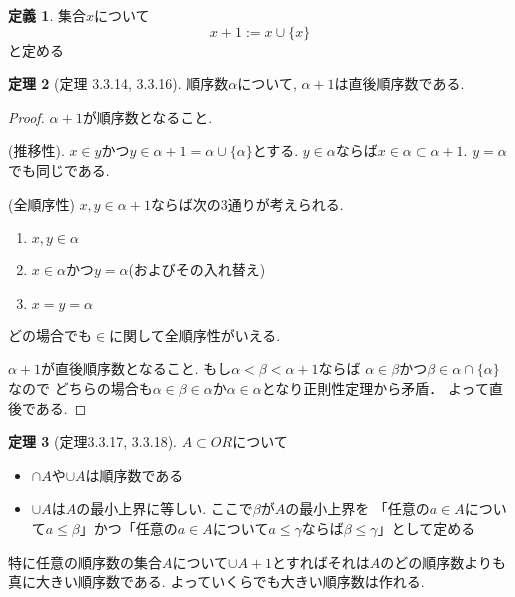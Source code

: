\documentclass[dvipdfmx,a4paper,11pt]{report}
\theoremstyle{definition}
\newtheorem{thm}{定理}
\newtheorem{dfn}[thm]{定義}
\begin{document}
 \begin{tcolorbox}
 [colback = white, colframe = green!35!black, fonttitle = \bfseries,breakable = true]
\begin{dfn}
集合$x$について
$$
x + 1
:= 
x \cup \{ x\}
$$
と定める
\end{dfn}
\end{tcolorbox}

 \begin{tcolorbox}
 [colback = white, colframe = green!35!black, fonttitle = \bfseries,breakable = true]
\begin{thm}[定理 3.3.14, 3.3.16]
順序数$\alpha$について, $\alpha + 1$は直後順序数である.
\end{thm}
\end{tcolorbox}

\begin{proof}
$\alpha +1$が順序数となること.

(推移性). $x \in y$かつ$y\in \alpha + 1=\alpha\cup \{ \alpha\}$とする. 
$y \in \alpha$ならば$x \in \alpha \subset \alpha+1$. $y=\alpha$でも同じである.

(全順序性)
$x,y \in \alpha+1$ならば次の3通りが考えられる.
\begin{enumerate}
\item $x, y\in \alpha$
\item $x \in \alpha$かつ$y = \alpha $(およびその入れ替え)
\item $x = y= \alpha$
\end{enumerate}
どの場合でも$\in$に関して全順序性がいえる.

$\alpha +1$が直後順序数となること.
もし$\alpha < \beta < \alpha +1$ならば
$\alpha \in \beta$かつ$\beta \in \alpha \cap \{ \alpha\}$なので
どちらの場合も$\alpha \in \beta \in \alpha$か$\alpha \in \alpha$となり正則性定理から矛盾．
よって直後である. 
\end{proof}

 \begin{tcolorbox}
 [colback = white, colframe = green!35!black, fonttitle = \bfseries,breakable = true]
\begin{thm}[定理3.3.17, 3.3.18]
$A \subset OR$について
\begin{itemize}
\item $\cap A$や$\cup A$は順序数である
\item $\cup A$は$A$の最小上界に等しい. ここで$\beta$が$A$の最小上界を
「任意の$a\in A$について$a \le \beta$」かつ「任意の$a\in A$について$a \le \gamma$ならば$\beta \le \gamma$」として定める
\end{itemize}
特に任意の順序数の集合$A$について$\cup A +1$とすればそれは$A$のどの順序数よりも真に大きい順序数である. よっていくらでも大きい順序数は作れる. 
\end{thm}
\end{tcolorbox}
\end{document}
